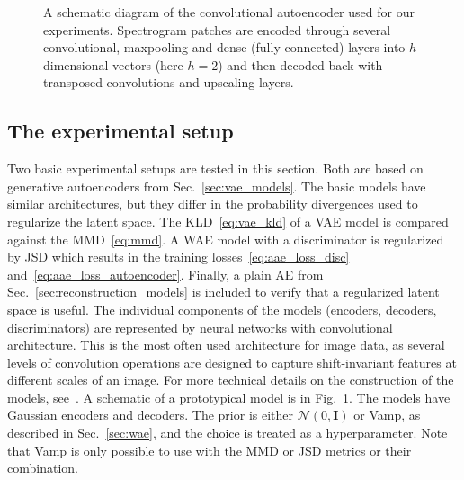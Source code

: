 \begin{figure}[ht]
\begin{center}
\end{center}
\caption{A schematic diagram of the convolutional autoencoder used for our experiments. Spectrogram patches are encoded through several convolutional, maxpooling and dense (fully connected) layers into $h$-dimensional vectors (here $h=2$) and then decoded back with transposed convolutions and upscaling layers.}
\label{fig:alfven_ae}
\end{figure}

\subsection{The experimental setup}
Two basic experimental setups are tested in this section. Both are based on generative autoencoders from Sec.~\ref{sec:vae_models}. The basic models have similar architectures, but they differ in the probability divergences used to regularize the latent space. The KLD~\eqref{eq:vae_kld} of a VAE model is compared against the MMD~\eqref{eq:mmd}. A WAE model with a discriminator is regularized by JSD which results in the training losses~\eqref{eq:aae_loss_disc} and~\eqref{eq:aae_loss_autoencoder}. Finally, a plain AE from Sec.~\ref{sec:reconstruction_models} is included to verify that a regularized latent space is useful. The individual components of the models (encoders, decoders, discriminators) are represented by neural networks with convolutional architecture. This is the most often used architecture for image data, as several levels of convolution operations are designed to capture shift-invariant features at different scales of an image. For more technical details on the construction of the models, see~\cite{vskvara2020detection}. A schematic of a prototypical model is in Fig.~\ref{fig:alfven_ae}. The models have Gaussian encoders and decoders. The prior is either $\mathcal{N}(0,\mathbf{I})$ or Vamp, as described in Sec.~\ref{sec:wae}, and the choice is treated as a hyperparameter. Note that Vamp is only possible to use with the MMD or JSD metrics or their combination.

